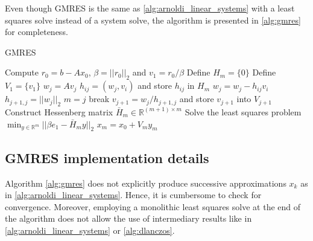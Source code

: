 Even though GMRES is the same as \cref{alg:arnoldi_linear_systems} with a least squares solve instead of a system solve, the algorithm is presented in \cref{alg:gmres} for completeness.
\begin{algorithm}[H]
    \caption{GMRES \cite[Algorithm 6.9]{iter_method_saad}}
    \label{alg:gmres}
    \begin{algorithmic}[1]
        \State Compute $r_0 = b - Ax_0$, $\beta = ||r_0||_2$ and $v_1 = r_0 / \beta$
        \State Define $H_m = \{0\}$
        \State Define $V_1 = \{v_1\}$
        \State $w_j = Av_j$
        \State $h_{ij} = (w_j, v_i)$ and store $h_{ij}$ in $H_m$
        \State $w_j = w_j - h_{ij}v_i$
        \EndFor
        \State $h_{j+1,j} = ||w_j||_2$
        \State $m = j$
        \State break
        \EndIf
        \State $v_{j+1} = w_j / h_{j+1,j}$ and store $v_{j+1}$ into $V_{j+1}$
        \EndFor
        \State Construct Hessenberg matrix $\bar{H}_m \in \mathbb{R}^{(m+1)\times m}$
        \State Solve the least squares problem $\min_{y \in \mathbb{R}^m} ||\beta e_1 - \bar{H}_m y||_2$
        \State $x_m = x_0 + V_m y_m$
    \end{algorithmic}
\end{algorithm}

\subsection{GMRES implementation details}
Algorithm \ref{alg:gmres} does not explicitly produce successive approximations $x_k$ as in \cref{alg:arnoldi_linear_systems}. Hence, it is cumbersome to check for convergence. Moreover, employing a monolithic least squares solve at the end of the algorithm does not allow the use of intermediary results like in \cref{alg:arnoldi_linear_systems} or \cref{alg:dlanczos}.

